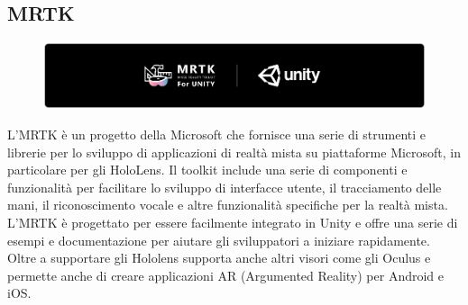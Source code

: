 \subsection{MRTK}
\begin{figure}[H]
    \includegraphics[width=\textwidth,height=\textheight,keepaspectratio]{figures/chapter_1/logo_mrtk_unity_banner.png}
    \centering
\end{figure}
L'MRTK è un progetto della Microsoft che fornisce una serie di strumenti e librerie per lo sviluppo di applicazioni di realtà mista su piattaforme Microsoft, in particolare per gli HoloLens. Il toolkit include una serie di componenti e funzionalità per facilitare lo sviluppo di interfacce utente, il tracciamento delle mani, il riconoscimento vocale e altre funzionalità specifiche per la realtà mista. L'MRTK è progettato per essere facilmente integrato in Unity e offre una serie di esempi e documentazione per aiutare gli sviluppatori a iniziare rapidamente.\\
Oltre a supportare gli Hololens supporta anche altri visori come gli Oculus e permette anche di creare applicazioni AR (Argumented Reality) per Android e iOS.\cite{WhatIsMixedRealityToolkit}


